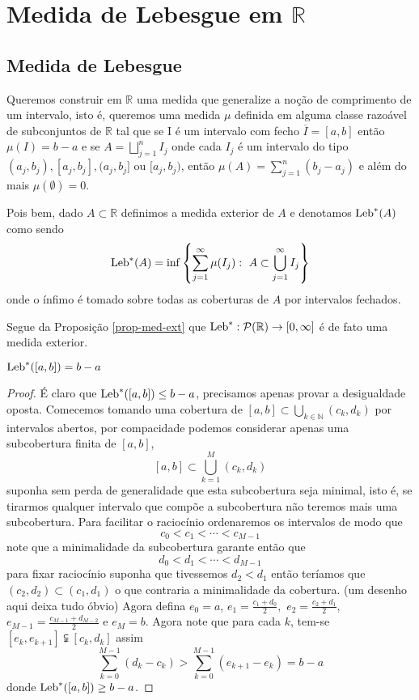 \chapter[Aula 3]{Medida de Lebesgue em $\mathbb{R}$}
\chaptermark{}






\section*{Medida de Lebesgue}


Queremos construir em $\mathbb{R}$ uma medida que 
generalize a noção de comprimento de  
um intervalo, isto é, queremos uma medida  
$\mu$ definida em alguma classe razoável de 
subconjuntos de $\mathbb{R}$ tal que se I é um intervalo
com fecho $\overline{I}=[a,b]$ então $\mu(I)=b-a$ 
e se $A=\bigsqcup_{j=1}^nI_j$ onde cada $I_j$ 
é um intervalo do tipo $(a_j,b_j), [a_j,b_j],(a_j,b_j]$ ou $[a_j,b_j)$,  
então $\mu(A)=\sum_{j=1}^n(b_j-a_j)$ e
além do mais $\mu(\emptyset)=0$.



Pois bem, dado $A\subset \mathbb{R}$ 
definimos a medida exterior de $A$ e 
denotamos $\textnormal{Leb}^{*}(A)$ como sendo 
$$
\textnormal{Leb}^{*}(A)=\inf 
				\left\{
					\sum_{j=1}^\infty \mu(I_j):~ A\subset \bigcup_{j=1}^\infty I_j 
				\right\}
$$
onde o ínfimo é tomado sobre todas as coberturas de $A$ por intervalos fechados.  

Segue da Proposição \ref{prop-med-ext} que 
$\textnormal{Leb}^{*}:\mathcal{P}(\mathbb{R})\to[0,\infty]$ é de fato uma medida exterior.

\begin{lema}\label{LEB 2}
$\textnormal{Leb}^{*}([a,b])=b-a$
\end{lema}

\begin{proof}
É claro que $\textnormal{Leb}^{*}([a,b])\leq b-a$, 
precisamos apenas provar a desigualdade oposta. 
Comecemos tomando uma cobertura de 
$[a,b]\subset \bigcup_{k\in \mathbb{N}} (c_k,d_k)$  
por intervalos abertos, por compacidade podemos considerar 
apenas uma subcobertura finita de $[a,b]$, 
$$
[a,b]\subset \bigcup_{k=1}^M(c_k,d_k)
$$
suponha sem perda de generalidade que esta subcobertura seja minimal, 
isto é, se tirarmos qualquer intervalo que compõe a subcobertura 
não teremos mais uma subcobertura. Para facilitar o raciocínio 
ordenaremos os intervalos de modo que 
$$
c_0<c_1<\cdots<c_{M-1}
$$
note que a minimalidade da subcobertura garante então que 
$$
d_0<d_1<\cdots<d_{M-1}
$$
para fixar raciocínio  suponha que tivessemos $d_2<d_1$ 
então teríamos que $(c_2,d_2)\subset (c_1,d_1)$ o 
que contraria a minimalidade da cobertura. 
({\red um desenho aqui deixa tudo óbvio}) 
Agora defina 
$e_0=a$, $e_1=\frac{c_1+d_0}{2},$ $e_2=\frac{c_2+d_1}{2}$,
$e_{M-1}=\frac{c_{M-1}+d_{M-2}}{2}$ e $e_{M}=b.$  
Agora note que  para cada $k$, 
tem-se $[e_k,e_{k+1}]\subsetneqq [c_k,d_k]$ assim 
$$
\sum_{k=0}^{M-1} (d_k-c_k)>\sum_{k=0}^{M-1} (e_{k+1}-e_k)=b-a
$$ 
donde $\textnormal{Leb}^{*}([a,b])\geq b-a$.

\end{proof}

